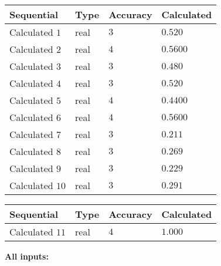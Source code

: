 \documentclass[12pt]{article}
\begin{document}
  
\noindent\begin{tabular}{|l|l|l|l|}
\hline
 Sequential & Type & Accuracy & Calculated \\ 
\hline
 
 
  Calculated $            1 $ & real & $            3  $ & 
 $ 0.520 $ 
 \\  \hline  
 
 
  Calculated $            2 $ & real & $            4  $ & 
 $ 0.5600 $ 
 \\  \hline  
 
 
  Calculated $            3 $ & real & $            3  $ & 
 $ 0.480 $ 
 \\  \hline  
 
 
  Calculated $            4 $ & real & $            3  $ & 
 $ 0.520 $ 
 \\  \hline  
 
 
  Calculated $            5 $ & real & $            4  $ & 
 $ 0.4400 $ 
 \\  \hline  
 
 
  Calculated $            6 $ & real & $            4  $ & 
 $ 0.5600 $ 
 \\  \hline  
 
 
  Calculated $            7 $ & real & $            3  $ & 
 $ 0.211 $ 
 \\  \hline  
 
 
  Calculated $            8 $ & real & $            3  $ & 
 $ 0.269 $ 
 \\  \hline  
 
 
  Calculated $            9 $ & real & $            3  $ & 
 $ 0.229 $ 
 \\  \hline  
 
 
  Calculated $           10 $ & real & $            3  $ & 
 $ 0.291 $ 
 \\  \hline  
 \end{tabular}
   
   
  
  
\noindent\begin{tabular}{|l|l|l|l|}
\hline
 Sequential & Type & Accuracy & Calculated \\ 
\hline
 
 
  Calculated $           11 $ & real & $            4  $ & 
 $ 1.000 $ 
 \\  \hline  
 \end{tabular}
   
   
   
   
\noindent\vspace{0.1in}\hspace{-0.08in} {\textbf{\Large{All inputs: }}}
   
\end{document}
